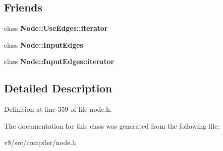 \subsection*{Friends}
\begin{DoxyCompactItemize}
\item 
\mbox{\label{classv8_1_1internal_1_1compiler_1_1Edge_ac68d910757e19ba0805380bdb57e60fb}} 
class {\bfseries Node\+::\+Use\+Edges\+::iterator}
\item 
\mbox{\label{classv8_1_1internal_1_1compiler_1_1Edge_aa239a791f0e57336d4f21027d44587e9}} 
class {\bfseries Node\+::\+Input\+Edges}
\item 
\mbox{\label{classv8_1_1internal_1_1compiler_1_1Edge_a015a5c14bdeb658aa095eca850e1c6aa}} 
class {\bfseries Node\+::\+Input\+Edges\+::iterator}
\end{DoxyCompactItemize}


\subsection{Detailed Description}


Definition at line 359 of file node.\+h.



The documentation for this class was generated from the following file\+:\begin{DoxyCompactItemize}
\item 
v8/src/compiler/node.\+h\end{DoxyCompactItemize}
